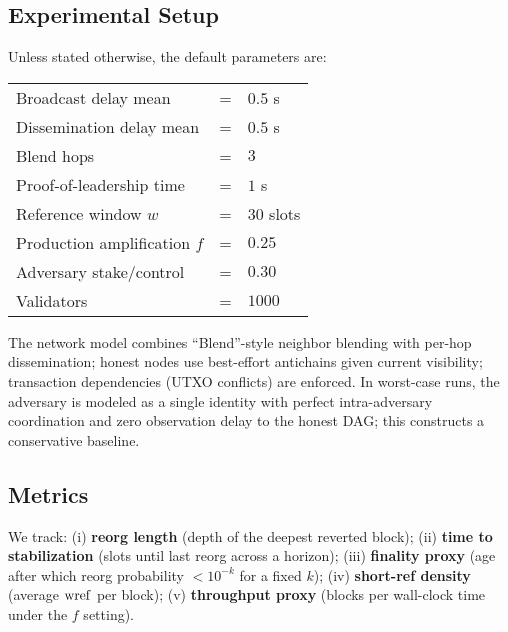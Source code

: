 \subsection{Experimental Setup}
Unless stated otherwise, the default parameters are:
\begin{center}
\begin{tabular}{lcl}
\toprule
Broadcast delay mean & = & $0.5$ s\\
Dissemination delay mean & = & $0.5$ s\\
Blend hops & = & $3$\\
Proof-of-leadership time & = & $1$ s\\
Reference window $w$ & = & $30$ slots\\
Production amplification $f$ & = & $0.25$\\
Adversary stake/control & = & $0.30$ \\
Validators & = & $1000$ \\
\bottomrule
\end{tabular}
\end{center}

The network model combines “Blend”-style neighbor blending with per-hop dissemination; honest nodes use best-effort antichains given current visibility; transaction dependencies (UTXO conflicts) are enforced. In worst-case runs, the adversary is modeled as a single identity with perfect intra-adversary coordination and zero observation delay to the honest DAG; this constructs a conservative baseline.

\subsection{Metrics}
We track: (i) \textbf{reorg length} (depth of the deepest reverted block); (ii) \textbf{time to stabilization} (slots until last reorg across a horizon); (iii) \textbf{finality proxy} (age after which reorg probability $<10^{-k}$ for a fixed $k$); (iv) \textbf{short-ref density} (average $\mathrm{wref}$ per block); (v) \textbf{throughput proxy} (blocks per wall-clock time under the $f$ setting). %

